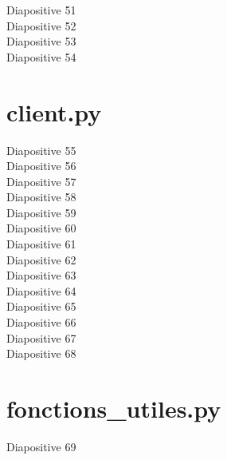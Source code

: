 \documentclass[french]{article}
\begin{document}

Diapositive 51 \\


Diapositive 52 \\


Diapositive 53 \\


Diapositive 54

\section{client.py}

Diapositive 55 \\


Diapositive 56 \\


Diapositive 57 \\


Diapositive 58 \\


Diapositive 59 \\


Diapositive 60 \\


Diapositive 61 \\


Diapositive 62 \\


Diapositive 63 \\


Diapositive 64 \\


Diapositive 65 \\


Diapositive 66 \\


Diapositive 67 \\


Diapositive 68

\section{fonctions\_utiles.py}

Diapositive 69 \\
\end{document}
